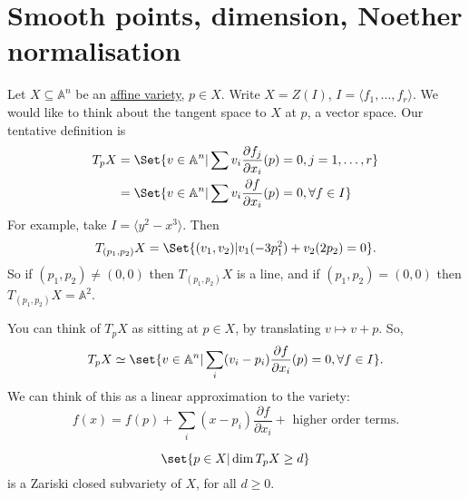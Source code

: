 \documentclass{article}
\newcommand{\A}{\mathbb{A}}
\begin{document}
\section{Smooth points, dimension, Noether normalisation}
Let $X \subseteq \A^n$ be an \hyperlink{def:affVar}{affine variety}, $p \in X$.
Write $X = Z(I)$, $I = \langle f_1, \dotsc, f_r \rangle$.
We would like to think about the tangent space to $X$ at $p$, a vector space.
Our tentative definition is
\begin{align*}
    T_p X &= \Set{v \in \A^n | \sum v_i \frac{\partial f_j}{\partial x_i}(p) = 0, j = 1,\dotsc, r} \\
    &= \Set{v \in \A^n | \sum v_i \frac{\partial f}{\partial x_i}(p) = 0, \forall f \in I}
\end{align*}
For example, take $I = \langle y^2 - x^3 \rangle$.
Then
\begin{equation*}
    T_{(p_1, p_2)} X = \Set{(v_1, v_2) | v_1 (-3p_1^2) + v_2 (2 p_2) = 0}.
\end{equation*}
So if $(p_1, p_2) \neq (0, 0)$ then $T_{(p_1, p_2)} X$ is a line, and if $(p_1, p_2) = (0, 0)$ then $T_{(p_1, p_2)} X = \A^2$.
\begin{remark}
    You can think of $T_p X$ as sitting at $p \in X$, by translating $v \mapsto v + p$.
    So,
    \begin{equation*}
        T_p X \simeq \set{v \in \A^n | \sum_i (v_i - p_i) \frac{\partial f}{\partial x_i} (p) = 0, \forall f \in I}.
    \end{equation*}
    We can think of this as a linear approximation to the variety:
    \begin{equation*}f(x) = f(p) + \sum_i (x - p_i) \frac{\partial f}{\partial x_i} + \text{ higher order terms}.\end{equation*}
\end{remark}
\begin{lemma}
    \begin{equation*}
        \set{p \in X | \dim T_p X \geq d}
    \end{equation*}
    is a Zariski closed subvariety of $X$, for all $d \geq 0$.
\end{lemma}
\end{document}
